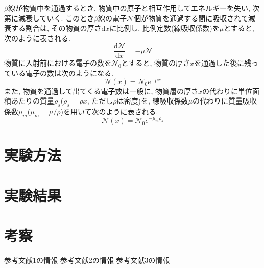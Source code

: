 \documentclass{jarticle}
\begin{document}
$\beta$線が物質中を通過するとき, 物質中の原子と相互作用してエネルギーを失い, 次第に減衰していく.
このとき$\beta$線の電子$\mathcal{N}$個が物質を通過する間に吸収されて減衰する割合は, その物質の厚さ$\mathrm{d}x$に比例し, 比例定数(線吸収係数)を$\mu$とすると, 次のように表される.
\begin{equation}
  \frac{\mathrm{d}\mathcal{N}}{\mathrm{d}x} = -\mu \mathcal{N}
\end{equation}
物質に入射前における電子の数を$\mathcal{N}_0$とすると, 物質の厚さ$x$を通過した後に残っている電子の数は次のようになる.
\begin{equation}
  \mathcal{N}(x) = \mathcal{N}_0 e^{-\mu x}
\end{equation}
また, 物質を通過して出てくる電子数は一般に, 物質層の厚さ$x$の代わりに単位面積あたりの質量$\rho_s$($\rho_s=\rho x$, ただし$\rho$は密度)を, 線吸収係数$\mu$の代わりに質量吸収係数$\mu_m$($\mu_m=\mu/\rho$)を用いて次のように表される.
\begin{equation}
  \mathcal{N}(x) = \mathcal{N}_0 e^{-\mu_m \rho_s}
\end{equation}



\section{実験方法}


\section{実験結果}


\section{考察}



\begin{thebibliography}{99}

   参考文献1の情報
   参考文献2の情報
   参考文献3の情報

\end{thebibliography}
\end{document}
